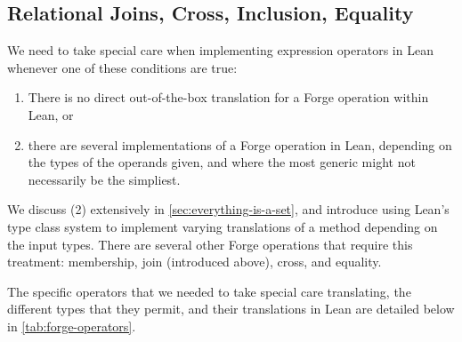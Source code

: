 \subsection{Relational Joins, Cross, Inclusion, Equality}\label{sec:join-cross-subset}

We need to take special care when implementing expression operators in Lean whenever one of these conditions are true: 
\begin{enumerate}[(1)]
  \item There is no direct out-of-the-box translation for a Forge operation within Lean, or
  \item there are several implementations of a Forge operation in Lean, depending on the types of the operands given, and where the most generic might not necessarily be the simpliest. 
\end{enumerate}
We discuss (2) extensively in \cref{sec:everything-is-a-set}, and introduce using Lean's type class system to implement varying translations of a method depending on the input types. There are several other Forge operations that require this treatment: membership, join (introduced above), cross, and equality. 

The specific operators that we needed to take special care translating, the different types that they permit, and their translations in Lean are detailed below in \cref{tab:forge-operators}. 


